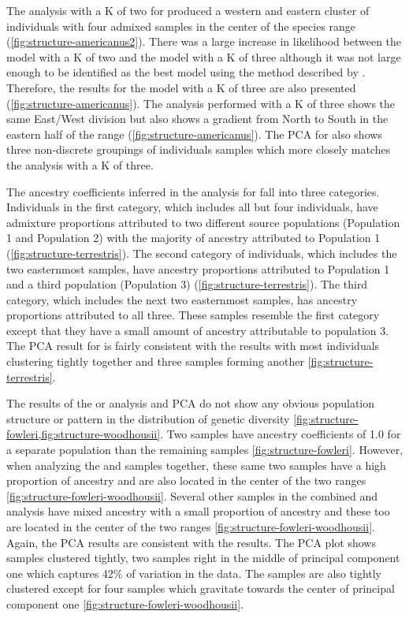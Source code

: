 The \structure analysis with a K of two for \amer produced a western and 
eastern cluster of individuals with four admixed samples in the center of 
the species range (\cref{fig:structure-americanus2}).
There was a large increase in likelihood between the model with a K of two and the
model with a K of three although it was not large enough to be identified as 
the best model using the method described by \cite{evanno2005}.
Therefore, the \structure results for the model with a K of three are also presented 
(\cref{fig:structure-americanus}).
The analysis performed with a K of three shows the same East/West division 
but also shows a gradient from North to South in the eastern half of the \amer 
range (\cref{fig:structure-americanus}).
The PCA for \amer also shows three non-discrete groupings of individuals \amer 
samples which more closely matches the \structure analysis with a K of three.

The ancestry coefficients inferred in the \structure analysis for \terr fall 
into three categories. 
Individuals in the first category, which includes all but four individuals, 
have admixture proportions attributed to two different source populations (Population 1 and Population 2)  
with the majority of ancestry attributed to Population 1 (\cref{fig:structure-terrestris}).
The second category of individuals, which includes the two easternmost samples, have  
ancestry proportions attributed to Population 1 and a third population 
(Population 3) (\cref{fig:structure-terrestris}).
The third category, which includes the next two easternmost samples, has 
ancestry proportions attributed to all three.
These samples resemble the first category except that they have a small amount
of ancestry attributable to population 3.
The PCA result for \terr is fairly consistent with the \structure results with 
most individuals clustering tightly together and three samples forming another \cref{fig:structure-terrestris}.

The results of the \fowl or \wood \structure analysis and PCA do not show any obvious 
population structure or pattern in the distribution of genetic diversity 
\cref{fig:structure-fowleri,fig:structure-woodhousii}.
Two \wood samples have ancestry coefficients of 1.0 for a separate population
than the remaining samples \cref{fig:structure-fowleri}.
However, when analyzing the \fowl and \wood samples together, these same two samples 
have a high proportion of \fowl ancestry and are also located 
in the center of the two ranges \cref{fig:structure-fowleri-woodhousii}.
Several other samples in the combined \fowl and \wood analysis have mixed ancestry 
with a small proportion of \wood ancestry and these too are located in the center of the two ranges
\cref{fig:structure-fowleri-woodhousii}. 
Again, the PCA results are consistent with the \structure results. 
The PCA plot shows \wood samples clustered tightly, two samples right in the 
middle of principal component one which captures 42\% of variation in the data. 
The \fowl samples are also tightly clustered except for four samples which 
gravitate towards the center of principal component one \cref{fig:structure-fowleri-woodhousii}. 


